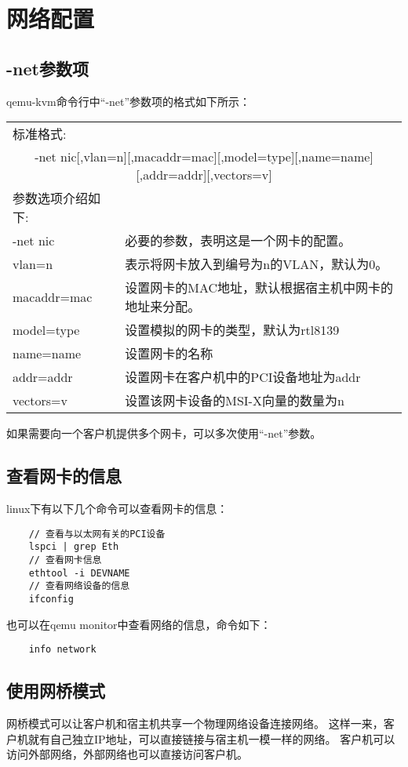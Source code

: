 \documentclass[a4paper,left=2.5cm,right=2.5cm,11pt]{article}
\newcommand{\interval}{\vspace{0.5em}}
\begin{document}
\clearpage

\section{网络配置}
\subsection{-net参数项}
	qemu-kvm命令行中“-net”参数项的格式如下所示：
	\interval
	\begin{longtable}{p{3cm}p{10cm}}
	\hline
	标准格式: & \\
	\multicolumn{2}{c}{-net nic[,vlan=n][,macaddr=mac][,model=type][,name=name][,addr=addr][,vectors=v]} \\
	\hline
	参数选项介绍如下: & \\
	\hline
	-net nic & 必要的参数，表明这是一个网卡的配置。 \\
	\hline
	vlan=n & 表示将网卡放入到编号为n的VLAN，默认为0。 \\
	\hline
	macaddr=mac & 设置网卡的MAC地址，默认根据宿主机中网卡的地址来分配。 \\
	\hline
	model=type & 设置模拟的网卡的类型，默认为rtl8139 \\
	\hline
	name=name & 设置网卡的名称 \\
	\hline
	addr=addr & 设置网卡在客户机中的PCI设备地址为addr \\
	\hline
	vectors=v & 设置该网卡设备的MSI-X向量的数量为n \\
	\hline
	\end{longtable}
	\interval

	如果需要向一个客户机提供多个网卡，可以多次使用“-net”参数。

\subsection{查看网卡的信息}
	linux下有以下几个命令可以查看网卡的信息：
	\begin{lstlisting}
	// 查看与以太网有关的PCI设备
	lspci | grep Eth
	// 查看网卡信息
	ethtool -i DEVNAME
	// 查看网络设备的信息
	ifconfig
	\end{lstlisting}

	也可以在qemu monitor中查看网络的信息，命令如下：
	\begin{lstlisting}
	info network
	\end{lstlisting}

\subsection{使用网桥模式}
	网桥模式可以让客户机和宿主机共享一个物理网络设备连接网络。
	这样一来，客户机就有自己独立IP地址，可以直接链接与宿主机一模一样的网络。
	客户机可以访问外部网络，外部网络也可以直接访问客户机。\\
\end{document}
